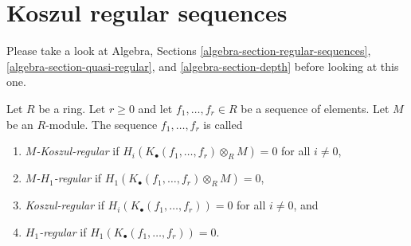 







\section{Koszul regular sequences}
\label{section-koszul-regular}

\noindent
Please take a look at
Algebra, Sections \ref{algebra-section-regular-sequences},
\ref{algebra-section-quasi-regular}, and
\ref{algebra-section-depth}
before looking at this one.

\begin{definition}
\label{definition-koszul-regular-sequence}
Let $R$ be a ring. Let $r \geq 0$ and let $f_1, \ldots, f_r \in R$
be a sequence of elements. Let $M$ be an $R$-module.
The sequence $f_1, \ldots, f_r$ is called
\begin{enumerate}
\item {\it $M$-Koszul-regular} if
$H_i(K_\bullet(f_1, \ldots, f_r) \otimes_R M) = 0$ for
all $i \not = 0$,
\item {\it $M$-$H_1$-regular} if
$H_1(K_\bullet(f_1, \ldots, f_r) \otimes_R M) = 0$,
\item {\it Koszul-regular} if $H_i(K_\bullet(f_1, \ldots, f_r)) = 0$ for
all $i \not = 0$, and
\item {\it $H_1$-regular} if $H_1(K_\bullet(f_1, \ldots, f_r)) = 0$.
\end{enumerate}
\end{definition}

